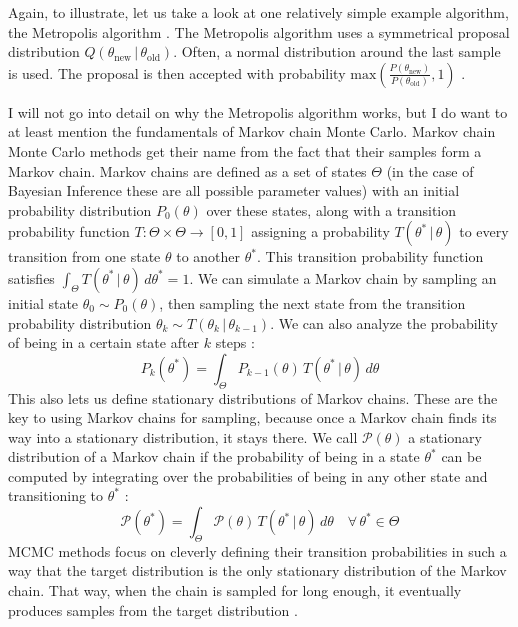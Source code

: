 \documentclass[12pt, a4paper]{report}
\begin{document}
Again, to illustrate, let us take a look at one relatively simple example algorithm, the Metropolis algorithm \cite{metropolis}.
The Metropolis algorithm uses a symmetrical proposal distribution $Q(\theta_{\textrm{new}} \,|\, \theta_{\textrm{old}})$.
Often, a normal distribution around the last sample is used.
The proposal is then accepted with probability $\textrm{max}\left(\frac{P(\theta_{\textrm{new}})}{P(\theta_{\textrm{old}})}, 1\right)$ \cite[p. 365f.]{mckay}.

I will not go into detail on why the Metropolis algorithm works, but I do want to at least mention the fundamentals of Markov chain Monte Carlo.
Markov chain Monte Carlo methods get their name from the fact that their samples form a Markov chain.
Markov chains are defined as a set of states $\Theta$ (in the case of Bayesian Inference these are all possible parameter values) with an initial probability distribution $P_0(\theta)$ over these states, along with a transition probability function $T: \Theta \times \Theta \rightarrow [0,1]$ assigning a probability $T(\theta^* \,|\, \theta)$ to every transition from one state $\theta$ to another $\theta^*$.
This transition probability function satisfies $\int_\Theta T(\theta^* \,|\, \theta) \, d\theta^* = 1$.
We can simulate a Markov chain by sampling an initial state $\theta_0 \sim P_0(\theta)$, then sampling the next state from the transition probability distribution $\theta_k \sim T(\theta_k \,|\, \theta_{k-1})$.
We can also analyze the probability of being in a certain state after $k$ steps \cite[372]{mckay}: 
$$
    P_k(\theta^*) = \int_{\Theta} P_{k-1}(\theta) \, T(\theta^* \,|\, \theta) \, d\theta 
$$
This also lets us define stationary distributions of Markov chains.
These are the key to using Markov chains for sampling, because once a Markov chain finds its way into a stationary distribution, it stays there.
We call $\mathcal{P}(\theta)$ a stationary distribution of a Markov chain if the probability of being in a state $\theta^*$ can be computed by integrating over the probabilities of being in any other state and transitioning to $\theta^*$ \cite[372]{mckay}:
$$
    \mathcal{P}(\theta^*) = \int_{\Theta} \mathcal{P}(\theta) \, T(\theta^* \,|\, \theta) \, d\theta \quad \forall \, \theta^* \in \Theta
$$
MCMC methods focus on cleverly defining their transition probabilities in such a way that the target distribution is the only stationary distribution of the Markov chain.
That way, when the chain is sampled for long enough, it eventually produces samples from the target distribution \cite[372]{mckay}.
\end{document}
